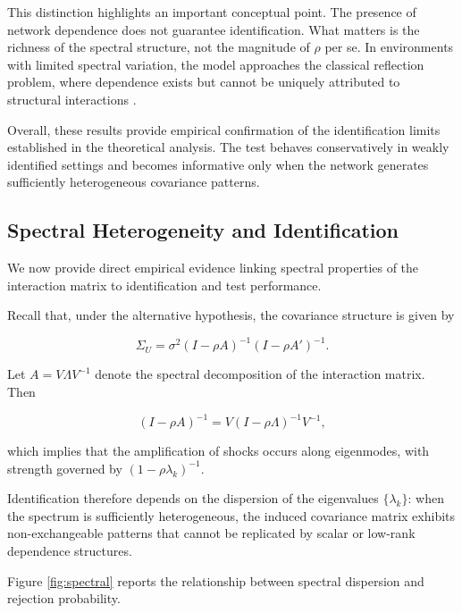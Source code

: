 \documentclass[12pt]{article}
\numberwithin{equation}{section}
\begin{document}
This distinction highlights an important conceptual point. The presence of network dependence does not guarantee identification. What matters is the richness of the spectral structure, not the magnitude of $\rho$ per se. In environments with limited spectral variation, the model approaches the classical reflection problem, where dependence exists but cannot be uniquely attributed to structural interactions \citep{manski1993identification}.

Overall, these results provide empirical confirmation of the identification limits established in the theoretical analysis. The test behaves conservatively in weakly identified settings and becomes informative only when the network generates sufficiently heterogeneous covariance patterns.

\subsection{Spectral Heterogeneity and Identification}

We now provide direct empirical evidence linking spectral properties of the interaction matrix to identification and test performance.

Recall that, under the alternative hypothesis, the covariance structure is given by

\begin{equation}
\Sigma_U = \sigma^2 (I - \rho A)^{-1}(I - \rho A')^{-1}.
\end{equation}

Let $A = V \Lambda V^{-1}$ denote the spectral decomposition of the interaction matrix. Then

\begin{equation}
(I - \rho A)^{-1}
=
V (I - \rho \Lambda)^{-1} V^{-1},
\end{equation}

which implies that the amplification of shocks occurs along eigenmodes, with strength governed by $(1 - \rho \lambda_k)^{-1}$.

Identification therefore depends on the dispersion of the eigenvalues $\{\lambda_k\}$: when the spectrum is sufficiently heterogeneous, the induced covariance matrix exhibits non-exchangeable patterns that cannot be replicated by scalar or low-rank dependence structures.

Figure \ref{fig:spectral} reports the relationship between spectral dispersion and rejection probability.
\end{document}
